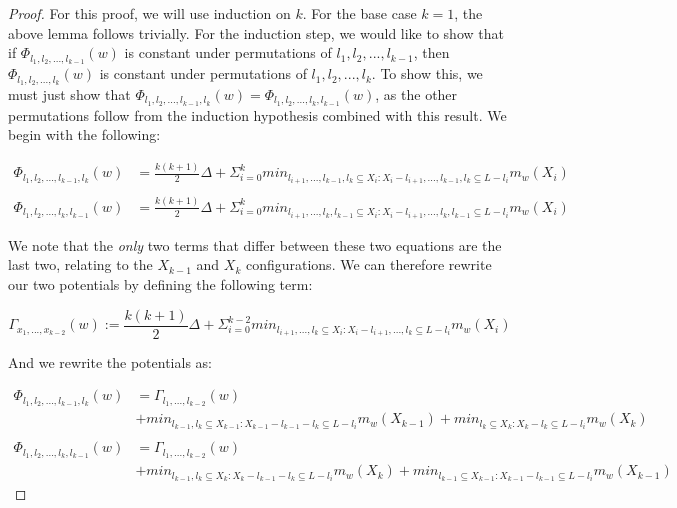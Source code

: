\begin{proof}
    For this proof, we will use induction on $k$. For the base case $k=1$, the above lemma follows trivially. For the induction step, we would like to show that if $\Phi_{l_1, l_2, ..., l_{k-1}}(w)$ is constant under permutations of $l_1, l_2, ..., l_{k-1}$, then $\Phi_{l_1, l_2, ..., l_k}(w)$ is constant under permutations of $l_1, l_2, ..., l_k$. To show this, we must just show that $\Phi_{l_1, l_2, ..., l_{k-1}, l_k}(w) = \Phi_{l_1, l_2, ..., l_k, l_{k-1}}(w)$, as the other permutations follow from the induction hypothesis combined with this result. We begin with the following: 

    \begin{equation*}
        \begin{split}
            \Phi_{l_1, l_2, ..., l_{k-1}, l_k}(w) &= \frac{k(k+1)}{2} \Delta + \Sigma_{i=0}^k min_{l_{i+1}, ..., l_{k-1}, l_k \subseteq X_i : X_i - l_{i+1}, ..., l_{k-1}, l_k \subseteq L - l_i} m_w(X_i) \\ \\
            \Phi_{l_1, l_2, ..., l_k, l_{k-1}}(w) &= \frac{k(k+1)}{2} \Delta + \Sigma_{i=0}^k min_{l_{i+1}, ..., l_k, l_{k-1} \subseteq X_i : X_i - l_{i+1}, ..., l_k, l_{k-1} \subseteq L - l_i} m_w(X_i)
        \end{split}
    \end{equation*}

    We note that the \textit{only} two terms that differ between these two equations are the last two, relating to the $X_{k-1}$ and $X_k$ configurations. We can therefore rewrite our two potentials by defining the following term:
    
    \begin{equation*}
            \Gamma_{x_1, ..., x_{k-2}}(w) := \frac{k(k+1)}{2} \Delta + \Sigma_{i=0}^{k-2} min_{l_{i+1}, ..., l_k \subseteq X_i : X_i - l_{i+1}, ..., l_k \subseteq L - l_i} m_w(X_i)
    \end{equation*}

    And we rewrite the potentials as: 

    \begin{equation*}
        \begin{split}
            \Phi_{l_1, l_2, ..., l_{k-1}, l_k}(w) &= \Gamma_{l_1, ..., l_{k-2}}(w) \\
            &+ min_{l_{k-1}, l_k \subseteq X_{k-1} : X_{k-1} - l_{k-1} - l_k \subseteq L - l_i} m_w(X_{k-1}) +  min_{l_k \subseteq X_k : X_k - l_k \subseteq L - l_i} m_w(X_{k}) \\ \\
            \Phi_{l_1, l_2, ..., l_{k}, l_{k-1}}(w) &= \Gamma_{l_1, ..., l_{k-2}}(w) \\
            &+ min_{l_{k-1}, l_k \subseteq X_{k} : X_{k} - l_{k-1} - l_k \subseteq L - l_i} m_w(X_{k}) +  min_{l_{k-1} \subseteq X_{k-1} : X_{k-1} - l_{k-1} \subseteq L - l_i} m_w(X_{k-1})
        \end{split}
    \end{equation*}
    

\end{proof}
